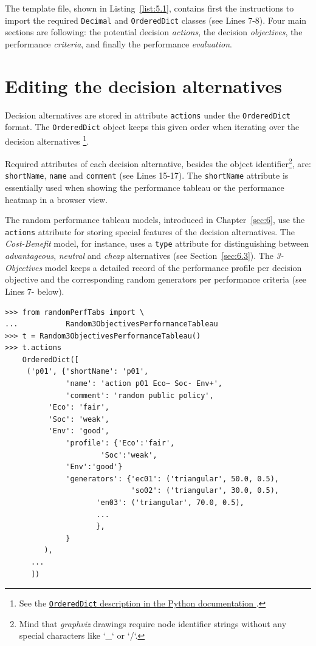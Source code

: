 The template file, shown in Listing~\vref{list:5.1}, contains first the instructions to import the required \texttt{Decimal} and \texttt{OrderedDict} classes (see Lines 7-8). Four main sections are following: the potential decision \emph{actions}, the decision \emph{objectives}, the performance \emph{criteria}, and finally the performance \emph{evaluation}.  

\section{Editing the decision alternatives}
\label{sec:5.2}

Decision alternatives are stored in attribute \texttt{actions} under the \texttt{OrderedDict} format. The \texttt{OrderedDict} object keeps this given order when iterating over the decision alternatives \footnote{See the \href{https://docs.python.org/3/library/collections.html}{\texttt{OrderedDict} description in the Python documentation \citep{python}}.}.

Required attributes of each decision alternative, besides the object identifier\footnote{Mind that \emph{graphviz} drawings require node identifier strings without any special characters like `\_` or `/`.},  are: \texttt{shortName}, \texttt{name} and \texttt{comment} (see Lines 15-17). The \texttt{shortName} attribute is essentially used when showing the performance tableau or the performance heatmap in a browser view.

The random performance tableau models, introduced in Chapter~\vref{sec:6}, use the \texttt{actions} attribute for storing special features of the decision alternatives. The \emph{Cost-Benefit} model, for instance, uses a \texttt{type} attribute for distinguishing between \emph{advantageous}, \emph{neutral} and \emph{cheap} alternatives (see Section~\vref{sec:6.3}). The \emph{3-Objectives} model keeps a detailed record of the performance profile per decision objective and the corresponding random generators per performance criteria (see Lines 7- below).
\begin{lstlisting}
>>> from randomPerfTabs import \
...           Random3ObjectivesPerformanceTableau
>>> t = Random3ObjectivesPerformanceTableau()
>>> t.actions
    OrderedDict([
     ('p01', {'shortName': 'p01',
              'name': 'action p01 Eco~ Soc- Env+',
              'comment': 'random public policy',
	      'Eco': 'fair',
	      'Soc': 'weak',
	      'Env': 'good',
              'profile': {'Eco':'fair',
	                  'Soc':'weak',
			  'Env':'good'}
              'generators': {'ec01': ('triangular', 50.0, 0.5),
                             'so02': ('triangular', 30.0, 0.5),
		             'en03': ('triangular', 70.0, 0.5),
		             ...
		             },
              }
         ),
      ...
      ])
\end{lstlisting}

